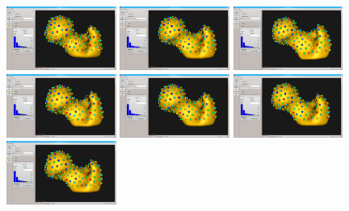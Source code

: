 \documentclass[letterpaper,12pt]{article}   %
\begin{document}
\begin{figure}[!htp]
	\centering
	\includegraphics[width=0.32\textwidth]{figs_v2/femur_analyze_mode1_neg2std.png}
	\includegraphics[width=0.32\textwidth]{figs_v2/femur_analyze_mode1_mean.png}
	\includegraphics[width=0.32\textwidth]{figs_v2/femur_analyze_mode1_pos2std.png} \\
	\includegraphics[width=0.32\textwidth]{figs_v2/femur_analyze_mode2_neg2std.png}
	\includegraphics[width=0.32\textwidth]{figs_v2/femur_analyze_mode1_mean.png}
	\includegraphics[width=0.32\textwidth]{figs_v2/femur_analyze_mode2_pos2std.png} \\
	\includegraphics[width=0.32\textwidth]{figs_v2/femur_analyze_mode3_neg2std.png}

\end{figure}
\end{document}
